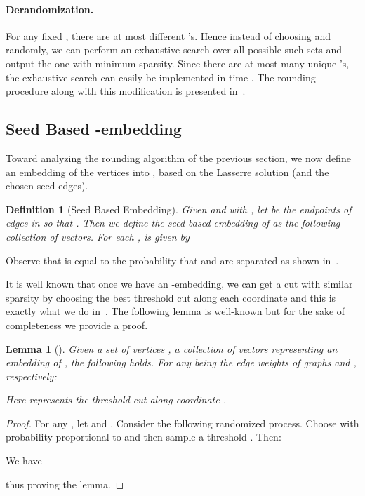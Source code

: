 \documentclass{article}
\newtheorem{definition}{Definition}[section]
\newtheorem{lemma}{Lemma}[section]
\newcounter{alg-count}
\def\ngap{}
\begin{document}
\paragraph{Derandomization.} 
For any fixed , there are at most  different
's.  Hence instead of choosing  and
 randomly, we can perform an exhaustive search over all
possible such sets and output the one with minimum sparsity.  Since
there are at most  many unique 's, the
exhaustive search can easily be implemented in time .  The rounding procedure along with this modification is
presented in~.
\ngap
\subsection{Seed Based -embedding}
Toward analyzing the rounding algorithm of the previous section, we
now define an embedding of the vertices into , based on the
Lasserre solution (and the chosen seed edges).
\begin{definition}[Seed Based Embedding]
  \label{def:our-embedding}
  Given  and  with , let  be the endpoints of
  edges in  so that . Then we
  define the seed based embedding of  as the following
  collection of vectors.
For each ,  is given
  by
  
\end{definition}
Observe that  is equal to the
probability that  and  are separated as shown
in~.

It is well known that once we have an -embedding, we can get a
cut with similar sparsity by choosing the best threshold cut along
each coordinate and this is exactly what we do
in~.
The following lemma is well-known but for the sake of completeness we
provide a proof.
\begin{lemma}[\cite{llr}]
  \label{lem:l1-to-cut}
  Given a set of vertices , a collection of vectors  representing an
  embedding of , the following holds.  For any  being the edge weights of graphs  and ,
  respectively:
   
  Here  represents the threshold cut along coordinate .
\end{lemma}
\begin{proof}For any , let 
  and .
Consider the following randomized process.  Choose 
  with probability proportional to  and then sample a
  threshold .
  Then:

We have
  
  thus proving the lemma.
\end{proof}			 
\end{document}
